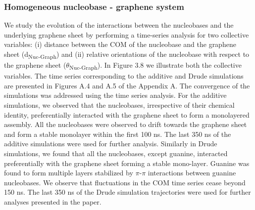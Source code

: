     \subsubsection{Homogeneous nucleobase - graphene system}
    We study the evolution of the interactions between the nucleobases and the underlying graphene sheet by performing a time-series analysis for two collective variables: (i) distance between the COM of the nucleobase and the graphene sheet (d\textsubscript{Nuc-Graph}) and (ii) relative orientations of the nucleobase with respect to the graphene sheet ($\theta$\textsubscript{Nuc-Graph}). In Figure 3.8 we illustrate both the collective variables. The time series corresponding to the additive and Drude simulations are presented in Figures A.4 and A.5 of the Appendix A. The convergence of the simulations was addressed using the time series analysis. For the additive simulations, we observed that the nucleobases, irrespective of their chemical identity, preferentially interacted with the graphene sheet to form a monolayered assembly. All the nucleobases were observed to drift towards the graphene sheet and form a stable monolayer within the first 100 ns. The last 350 ns of the additive simulations were used for further analysis. Similarly in Drude simulations, we found that all the nucleobases, except guanine, interacted preferentially with the graphene sheet forming a stable mono-layer. Guanine was found to form multiple layers stabilized by $\pi$-$\pi$ interactions between guanine nucleobases. We observe that fluctuations in the COM time series cease beyond 150 ns. The last 350 ns of the Drude simulation trajectories were used for further analyses presented in the paper. 
